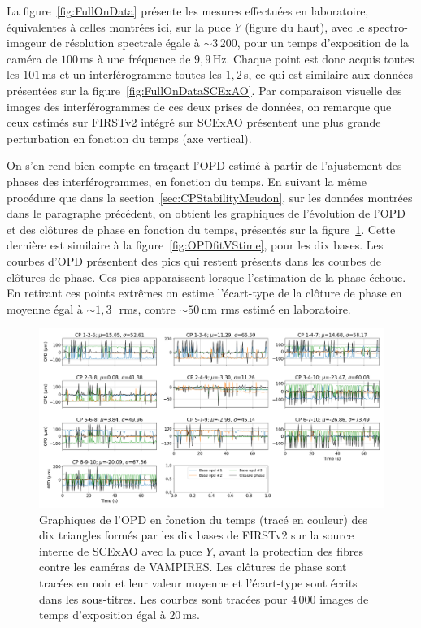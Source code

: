 La figure~\ref{fig:FullOnData} présente les mesures effectuées en laboratoire, équivalentes à celles montrées ici, sur la puce $Y$ (figure du haut), avec le spectro-imageur de résolution spectrale égale à $\sim 3\,200$, pour un temps d'exposition de la caméra de $100 \,$ms à une fréquence de $9,9 \,$Hz. Chaque point est donc acquis toutes les $101 \,$ms et un interférogramme toutes les $1,2 \,$s, ce qui est similaire aux données présentées sur la figure~\ref{fig:FullOnDataSCExAO}. Par comparaison visuelle des images des interférogrammes de ces deux prises de données, on remarque que ceux estimés sur \ac{FIRSTv2} intégré sur \ac{SCExAO} présentent une plus grande perturbation en fonction du temps (axe vertical). 

On s'en rend bien compte en traçant l'\ac{OPD} estimé à partir de l'ajustement des phases des interférogrammes, en fonction du temps. En suivant la même procédure que dans la section~\ref{sec:CPStabilityMeudon}, sur les données montrées dans le paragraphe précédent, on obtient les graphiques de l'évolution de l'\ac{OPD} et des clôtures de phase en fonction du temps, présentés sur la figure~\ref{fig:OPDfitVStimeSubaru}. Cette dernière est similaire à la figure~\ref{fig:OPDfitVStime}, pour les dix bases. Les courbes d'\ac{OPD} présentent des pics qui restent présents dans les courbes de clôtures de phase. Ces pics apparaissent lorsque l'estimation de la phase échoue. En retirant ces points extrêmes on estime l'écart-type de la clôture de phase en moyenne égal à $\sim 1,3 \,$\um~rms, contre $\sim 50 \,$nm rms estimé en laboratoire.

\begin{figure}[ht!]
    \centering
    \includegraphics[width=\figwidth]{Figure_Chap5/20220225_SuperK_FullOnData_OPDFitCPvsTime_Pola1_Base_LaTex.png}
    \caption[Graphiques de l'OPD en fonction du temps des dix triangles formés par les dix bases de FIRSTv2 sur la source interne de SCExAO avec la puce $Y$, avant la protection des fibres.]{Graphiques de l'OPD en fonction du temps (tracé en couleur) des dix triangles formés par les dix bases de FIRSTv2 sur la source interne de SCExAO avec la puce $Y$, avant la protection des fibres contre les caméras de VAMPIRES. Les clôtures de phase sont tracées en noir et leur valeur moyenne et l'écart-type sont écrits dans les sous-titres. Les courbes sont tracées pour $4\,000$ images de temps d'exposition égal à $20 \,$ms.}
    \label{fig:OPDfitVStimeSubaru}
\end{figure}

